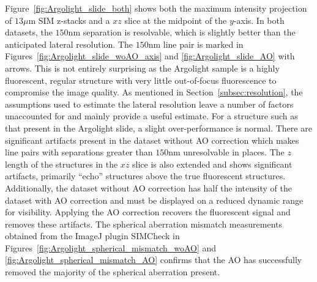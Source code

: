 Figure~\ref{fig:Argolight_slide_both} shows both the maximum intensity 
projection of $13\mu$m SIM z-stacks and a $xz$ slice at the midpoint of 
the $y$-axis. In both datasets, the $150$nm separation is resolvable, which 
is slightly better than the anticipated lateral resolution. The $150$nm line 
pair is marked in Figures~\ref{fig:Argolight_slide_woAO_axis} and 
\ref{fig:Argolight_slide_AO} with arrows. This is not 
entirely surprising as the Argolight sample is a highly fluorescent, 
regular structure with very little out-of-focus fluorescence to compromise 
the image quality. As mentioned in Section~\ref{subsec:resolution}, the 
assumptions used to estimate the lateral resolution leave a number of 
factors unaccounted for and mainly provide a useful 
estimate\cite{den1997resolution}. For a structure such as that present 
in the Argolight slide, a slight over-performance is normal. There are 
significant artifacts present in the dataset without AO correction which 
makes line pairs with separations greater than $150$nm unresolvable in 
places. The $z$ length of the structures in the $xz$ slice is also extended 
and shows significant artifacts, primarily ``echo'' structures above the true 
fluorescent structures. Additionally, the dataset without AO correction has 
half the intensity of the dataset with AO correction and must be displayed on 
a reduced dynamic range for visibility. Applying the AO correction recovers 
the fluorescent signal and removes these artifacts. The spherical 
aberration mismatch measurements obtained from the ImageJ plugin SIMCheck 
in Figures~\ref{fig:Argolight_spherical_mismatch_woAO} and 
\ref{fig:Argolight_spherical_mismatch_AO} confirms that the AO has 
successfully removed the majority of the spherical aberration 
present\cite{ball2015simcheck}.

